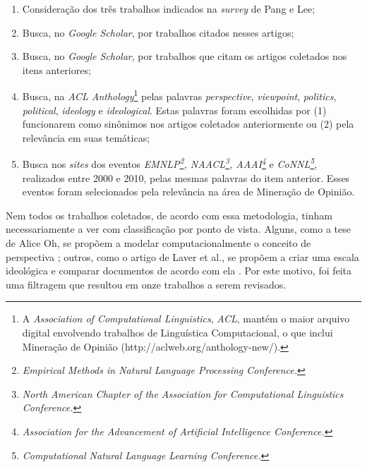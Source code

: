 \begin{enumerate}
\item Consideração dos três trabalhos indicados na \emph{survey} de Pang e Lee;
\item Busca, no \emph{Google Scholar}, por trabalhos citados nesses artigos;
\item Busca, no \emph{Google Scholar}, por trabalhos que citam os artigos coletados nos itens anteriores;
\item Busca, na \emph{ACL Anthology}\footnote{A \emph{Association of Computational Linguistics}, \emph{ACL}, mantém o maior arquivo digital envolvendo trabalhos de Linguística Computacional, o que inclui Mineração de Opinião (http://aclweb.org/anthology-new/).} pelas palavras \emph{perspective}, \emph{viewpoint}, \emph{politics}, \emph{political}, \emph{ideology} e \emph{ideological}. Estas palavras foram escolhidas por (1) funcionarem como sinônimos nos artigos coletados anteriormente ou (2) pela relevância em suas temáticas;
\item Busca nos \emph{sites} dos eventos \emph{EMNLP\footnote{\emph{Empirical Methods in Natural Language Processing Conference.}}, NAACL\footnote{\emph{North American Chapter of the Association for Computational Linguistics Conference.}}, AAAI\footnote{\emph{Association for the Advancement of Artificial Intelligence Conference.}}} e \emph{CoNNL\footnote{\emph{Computational Natural Language Learning Conference.}}}, realizados entre 2000 e 2010, pelas mesmas palavras do item anterior. Esses eventos foram selecionados pela relevância na área de Mineração de Opinião. 
\end{enumerate}

Nem todos os trabalhos coletados, de acordo com essa metodologia, tinham necessariamente a ver com classificação por ponto de vista. Alguns, como a tese de Alice Oh, se propõem a modelar computacionalmente o conceito de perspectiva \cite{alice-oh}; outros, como o artigo de Laver et al., se propõem a criar uma escala ideológica e comparar documentos de acordo com ela \cite{wordscores}.  Por este motivo, foi feita uma filtragem que resultou em onze trabalhos a serem revisados. 

